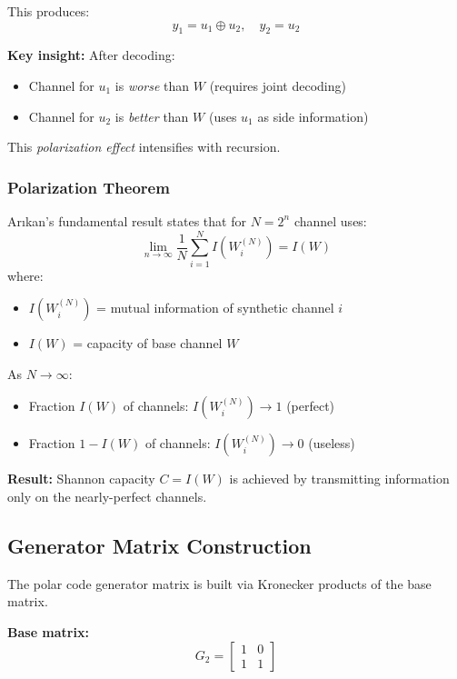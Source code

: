 This produces:
\begin{equation}
y_1 = u_1 \oplus u_2, \quad y_2 = u_2
\end{equation}

\textbf{Key insight:} After decoding:
\begin{itemize}
\item Channel for $u_1$ is \emph{worse} than $W$ (requires joint decoding)
\item Channel for $u_2$ is \emph{better} than $W$ (uses $u_1$ as side information)
\end{itemize}

This \emph{polarization effect} intensifies with recursion.

\subsubsection{Polarization Theorem}

Ar{\i}kan's fundamental result states that for $N = 2^n$ channel uses:
\begin{equation}
\lim_{n \to \infty} \frac{1}{N} \sum_{i=1}^{N} I(W_i^{(N)}) = I(W)
\end{equation}
where:
\begin{itemize}
\item $I(W_i^{(N)})$ = mutual information of synthetic channel $i$
\item $I(W)$ = capacity of base channel $W$
\end{itemize}

As $N \to \infty$:
\begin{itemize}
\item Fraction $I(W)$ of channels: $I(W_i^{(N)}) \to 1$ (perfect)
\item Fraction $1 - I(W)$ of channels: $I(W_i^{(N)}) \to 0$ (useless)
\end{itemize}

\textbf{Result:} Shannon capacity $C = I(W)$ is achieved by transmitting information only on the nearly-perfect channels.

\subsection{Generator Matrix Construction}

The polar code generator matrix is built via Kronecker products of the base matrix.

\textbf{Base matrix:}
\begin{equation}
G_2 = \begin{bmatrix} 1 & 0 \\ 1 & 1 \end{bmatrix}
\end{equation}

